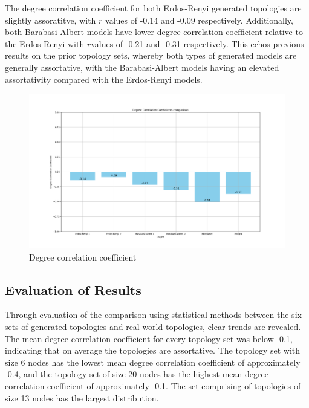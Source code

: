 The degree correlation coefficient for both Erdos-Renyi generated topologies are slightly assoratitve, with $r$ values of -0.14 and -0.09 respectively. Additionally, both Barabasi-Albert models have lower degree correlation coefficient relative to the Erdos-Renyi with $r $values of -0.21 and -0.31 respectively. This echos previous results on the prior topology sets, whereby both types of generated models are generally assortative, with the Barabasi-Albert models having an elevated assortativity compared with the Erdos-Renyi models. 

\begin{figure}
    \centering
    \includegraphics[width=0.9\linewidth]{images/FINAL-TOPO-COMP/Degree-correlation-coeff/deg-coeff-27.png}
    \caption{Degree correlation coefficient}
    \label{fig:enter-label}
\end{figure}

\subsection{Evaluation of Results}
Through evaluation of the comparison using statistical methods between the six sets of generated topologies and real-world topologies, clear trends are revealed. The mean degree correlation coefficient for every topology set was below -0.1, indicating that on average the topologies are assortative. The topology set with size 6 nodes has the lowest mean degree correlation coefficient of approximately -0.4, and the topology set of size 20 nodes has the highest mean degree correlation coefficient of approximately -0.1. The set comprising of topologies of size 13 nodes has the largest distribution.    

